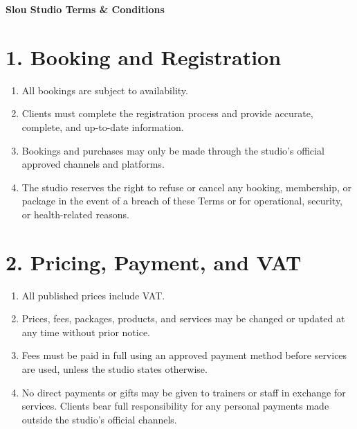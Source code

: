 \documentclass[12pt,a4paper]{article}
\begin{document}
\newpage


\begin{center}
    {\Large\bfseries Slou Studio Terms \& Conditions}
\end{center}

\vspace{1em}

\section*{1. Booking and Registration}
\begin{enumerate}
    \item All bookings are subject to availability.
    \item Clients must complete the registration process and provide accurate, complete, and up-to-date information.
    \item Bookings and purchases may only be made through the studio’s official approved channels and platforms.
    \item The studio reserves the right to refuse or cancel any booking, membership, or package in the event of a breach of these Terms or for operational, security, or health-related reasons.
\end{enumerate}

\section*{2. Pricing, Payment, and VAT}
\begin{enumerate}
    \item All published prices include VAT.
    \item Prices, fees, packages, products, and services may be changed or updated at any time without prior notice.
    \item Fees must be paid in full using an approved payment method before services are used, unless the studio states otherwise.
    \item No direct payments or gifts may be given to trainers or staff in exchange for services. Clients bear full responsibility for any personal payments made outside the studio’s official channels.
\end{enumerate}
\end{document}
